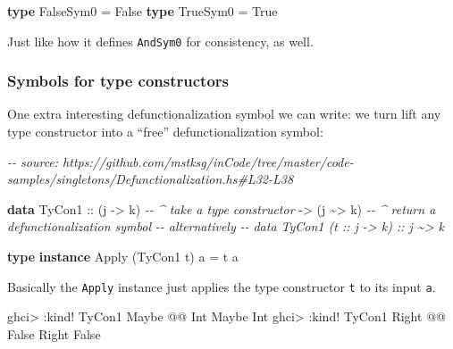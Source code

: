 \documentclass[]{article}
\newenvironment{Shaded}{}{}
\newcommand{\CommentTok}[1]{\textcolor[rgb]{0.38,0.63,0.69}{\textit{#1}}}
\newcommand{\DataTypeTok}[1]{\textcolor[rgb]{0.56,0.13,0.00}{#1}}
\newcommand{\KeywordTok}[1]{\textcolor[rgb]{0.00,0.44,0.13}{\textbf{#1}}}
\newcommand{\NormalTok}[1]{#1}
\newcommand{\OperatorTok}[1]{\textcolor[rgb]{0.40,0.40,0.40}{#1}}
\newcommand{\OtherTok}[1]{\textcolor[rgb]{0.00,0.44,0.13}{#1}}
\begin{document}
\begin{Shaded}
\begin{Highlighting}[]
\KeywordTok{type} \DataTypeTok{FalseSym0} \OtherTok{=} \DataTypeTok{\textquotesingle{}False}
\KeywordTok{type} \DataTypeTok{TrueSym0}  \OtherTok{=} \DataTypeTok{\textquotesingle{}True}
\end{Highlighting}
\end{Shaded}

Just like how it defines \texttt{AndSym0} for consistency, as well.

\hypertarget{symbols-for-type-constructors}{%
\subsubsection{Symbols for type
constructors}\label{symbols-for-type-constructors}}

One extra interesting defunctionalization symbol we can write: we turn lift any
type constructor into a ``free'' defunctionalization symbol:

\begin{Shaded}
\begin{Highlighting}[]
\CommentTok{{-}{-} source: https://github.com/mstksg/inCode/tree/master/code{-}samples/singletons/Defunctionalization.hs\#L32{-}L38}

\KeywordTok{data} \DataTypeTok{TyCon1}
\OtherTok{        ::}\NormalTok{ (j }\OtherTok{{-}>}\NormalTok{ k)     }\CommentTok{{-}{-} \^{} take a type constructor}
        \OtherTok{{-}>}\NormalTok{ (j }\OperatorTok{\textasciitilde{}>}\NormalTok{ k)     }\CommentTok{{-}{-} \^{} return a defunctionalization symbol}
\CommentTok{{-}{-} alternatively}
\CommentTok{{-}{-} data TyCon1 (t :: j {-}> k) :: j \textasciitilde{}> k}

\KeywordTok{type} \KeywordTok{instance} \DataTypeTok{Apply}\NormalTok{ (}\DataTypeTok{TyCon1}\NormalTok{ t) a }\OtherTok{=}\NormalTok{ t a}
\end{Highlighting}
\end{Shaded}

Basically the \texttt{Apply} instance just applies the type constructor
\texttt{t} to its input \texttt{a}.

\begin{Shaded}
\begin{Highlighting}[]
\NormalTok{ghci}\OperatorTok{>} \OperatorTok{:}\NormalTok{kind}\OperatorTok{!} \DataTypeTok{TyCon1} \DataTypeTok{Maybe} \OperatorTok{@@} \DataTypeTok{Int}
\DataTypeTok{Maybe} \DataTypeTok{Int}
\NormalTok{ghci}\OperatorTok{>} \OperatorTok{:}\NormalTok{kind}\OperatorTok{!} \DataTypeTok{TyCon1} \DataTypeTok{\textquotesingle{}Right} \OperatorTok{@@} \DataTypeTok{\textquotesingle{}False}
\DataTypeTok{\textquotesingle{}Right} \DataTypeTok{\textquotesingle{}False}
\end{Highlighting}
\end{Shaded}
\end{document}
